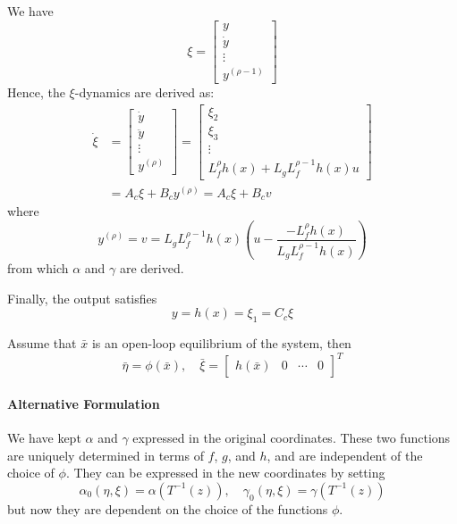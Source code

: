 We have
\begin{equation*}
    \xi = \begin{bmatrix}
        y       \\
        \dot{y} \\
        \vdots  \\
        y^{(\rho - 1)}
    \end{bmatrix}
\end{equation*}
Hence, the $\xi$-dynamics are derived as:
\begin{align*}
    \dot{\xi} & =
    \begin{bmatrix}
        \dot{y}  \\
        \ddot{y} \\
        \vdots   \\
        y^{(\rho)}
    \end{bmatrix}
    =
    \begin{bmatrix}
        \xi_2  \\
        \xi_3  \\
        \vdots \\
        L_f^\rho h(x) + L_g L_f^{\rho - 1} h(x) u
    \end{bmatrix}                 \\
              & = A_c \xi + B_c y^{(\rho)} = A_c \xi + B_c v
\end{align*}
where
\begin{equation*}
    y^{(\rho)} = v = L_g L_f^{\rho - 1} h(x) \left(u - \frac{-L_f^\rho h(x)}{L_g L_f^{\rho - 1} h(x)} \right)
\end{equation*}
from which $\alpha$ and $\gamma$ are derived.

\newpar{}

Finally, the output satisfies
\begin{equation*}
    y = h(x) = \xi_1 = C_c \xi
\end{equation*}

\newpar{}

Assume that $\bar{x}$ is an open-loop equilibrium of the system, then
\begin{equation*}
    \bar{\eta} = \phi(\bar{x}), \quad \bar{\xi} = \begin{bmatrix} h(\bar{x}) & 0 & \cdots & 0 \end{bmatrix}^T
\end{equation*}

\paragraph{Alternative Formulation}
We have kept $\alpha$ and $\gamma$ expressed in the original coordinates. These two functions are uniquely determined in terms of $f$, $g$, and $h$, and are independent of the choice of $\phi$. They can be expressed in the new coordinates by setting
\begin{equation*}
    \alpha_0(\eta, \xi) = \alpha(T^{-1}(z)), \quad \gamma_0(\eta, \xi) = \gamma(T^{-1}(z))
\end{equation*}
but now they are dependent on the choice of the functions $\phi$.

